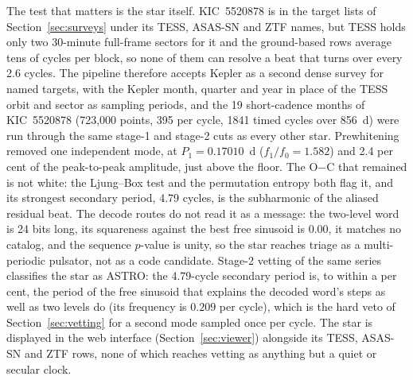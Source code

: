 \documentclass[final,5p]{elsarticle}
\newcommand{\oc}{O$-$C}
\begin{document}
The test that matters is the star itself. KIC~5520878 is in the target lists of Section~\ref{sec:surveys} under its TESS, ASAS-SN and ZTF names, but TESS holds only two 30-minute full-frame sectors for it and the ground-based rows average tens of cycles per block, so none of them can resolve a beat that turns over every 2.6 cycles. The pipeline therefore accepts Kepler as a second dense survey for named targets, with the Kepler month, quarter and year in place of the TESS orbit and sector as sampling periods, and the 19 short-cadence months of KIC~5520878 (723{,}000 points, 395 per cycle, 1841 timed cycles over 856~d) were run through the same stage-1 and stage-2 cuts as every other star. Prewhitening removed one independent mode, at $P_1=0.17010$~d ($f_1/f_0=1.582$) and 2.4 per cent of the peak-to-peak amplitude, just above the floor. The \oc{} that remained is not white: the Ljung--Box test and the permutation entropy both flag it, and its strongest secondary period, 4.79 cycles, is the subharmonic of the aliased residual beat. The decode routes do not read it as a message: the two-level word is 24 bits long, its squareness against the best free sinusoid is $0.00$, it matches no catalog, and the sequence $p$-value is unity, so the star reaches triage as a multi-periodic pulsator, not as a code candidate. Stage-2 vetting of the same series classifies the star as ASTRO: the 4.79-cycle secondary period is, to within a per cent, the period of the free sinusoid that explains the decoded word's steps as well as two levels do (its frequency is $0.209$ per cycle), which is the hard veto of Section~\ref{sec:vetting} for a second mode sampled once per cycle. The star is displayed in the web interface (Section~\ref{sec:viewer}) alongside its TESS, ASAS-SN and ZTF rows, none of which reaches vetting as anything but a quiet or secular clock.
\end{document}
